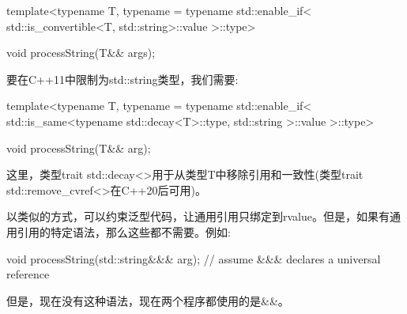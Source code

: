 \begin{cppcode}
template<typename T,
typename = typename std::enable_if<
std::is_convertible<T, std::string>::value
>::type>

void processString(T&& args);
\end{cppcode}

要在C++11中限制为std::string类型，我们需要:

\begin{cppcode}
template<typename T,
typename = typename std::enable_if<
std::is_same<typename std::decay<T>::type,
				std::string
			>::value
		>::type>

void processString(T&& arg);
\end{cppcode}

这里，类型trait std::decay<>用于从类型T中移除引用和一致性(类型trait std::remove_cvref<>在C++20后可用)。

以类似的方式，可以约束泛型代码，让通用引用只绑定到rvalue。但是，如果有通用引用的特定语法，那么这些都不需要。例如:

\begin{cppcode}
void processString(std::string&&& arg); // assume &&& declares a universal reference
\end{cppcode}

但是，现在没有这种语法，现在两个程序都使用的是\&\&。




























